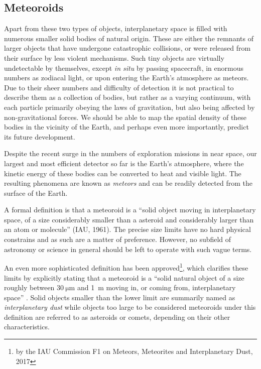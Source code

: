     \subsection{Meteoroids} \label{iam}
        Apart from these two types of objects, interplanetary space is filled with numerous
        smaller solid bodies of natural origin. These are either the remnants of larger objects
        that have undergone catastrophic collisions, or were released from their surface by less violent mechanisms.
        Such tiny objects are virtually undetectable by themselves, except \textit{in situ} by passing spacecraft,
        in enormous numbers as zodiacal light, or upon entering the Earth's atmosphere as meteors.
        Due to their sheer numbers and difficulty of detection it is not practical to describe them as a collection of bodies,
        but rather as a varying continuum, with each particle primarily obeying the laws of gravitation,
        but also being affected by non-gravitational forces.
        We should be able to map the spatial density of these bodies in the vicinity of the Earth,
        and perhaps even more importantly, predict its future development.

        Despite the recent surge in the numbers of exploration missions in near space,
        our largest and most efficient detector so far is the Earth's atmosphere,
        where the kinetic energy of these bodies can be converted to heat and visible light.
        The resulting phenomena are known as \emph{meteors} and can be readily detected from the surface of the Earth.

        A formal definition is that a meteoroid is a ``solid object moving in interplanetary space,
        of a size considerably smaller than a asteroid and considerably larger than an atom or molecule'' (IAU, 1961).
        The precise size limits have no hard physical constrains and as such are a matter of preference.
        However, no subfield of astronomy or science in general should be left to operate with such vague terms.

        An even more sophisticated definition has been approved\footnote{by the IAU Commission
        F1 on Meteors, Meteorites and Interplanetary Dust, 2017},
        which clarifies these limits by explicitly stating that a meteoroid is a ``solid natural object
        of a size roughly between $\SI{30}{\micro\metre}$ and \SI{1}{\metre} moving in, or coming from, interplanetary space'' \citep{imo-definitions}.
        Solid objects smaller than the lower limit are summarily named as \emph{interplanetary dust} while objects
        too large to be considered meteoroids under this definition are referred to as
        asteroids or comets, depending on their other characteristics.

